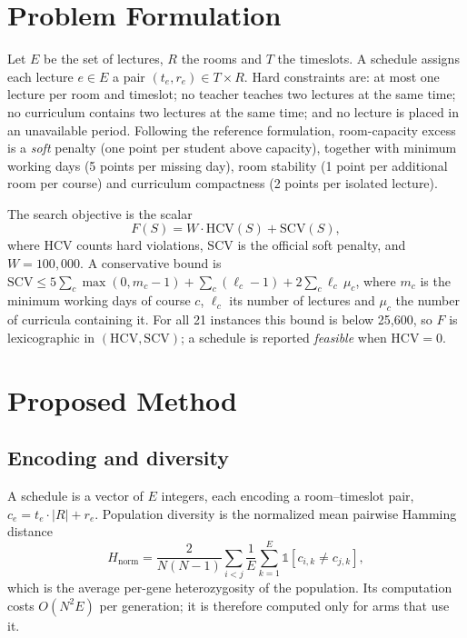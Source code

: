 \documentclass[journal]{IEEEtran}
\begin{document}
\section{Problem Formulation}
\label{sec:problem}
Let $E$ be the set of lectures, $R$ the rooms and $T$ the timeslots. A schedule assigns each lecture $e\in E$ a pair $(t_e,r_e)\in T\times R$. Hard constraints are: at most one lecture per room and timeslot; no teacher teaches two lectures at the same time; no curriculum contains two lectures at the same time; and no lecture is placed in an unavailable period. Following the reference formulation, room-capacity excess is a \emph{soft} penalty (one point per student above capacity), together with minimum working days (5 points per missing day), room stability (1 point per additional room per course) and curriculum compactness (2 points per isolated lecture).

The search objective is the scalar
\begin{equation}
F(S) = W\cdot \mathrm{HCV}(S) + \mathrm{SCV}(S),
\end{equation}
where $\mathrm{HCV}$ counts hard violations, $\mathrm{SCV}$ is the official soft penalty, and $W=100{,}000$. A conservative bound is $\mathrm{SCV}\le 5\sum_c\max(0,m_c-1)+\sum_c(\ell_c-1)+2\sum_c \ell_c\,\mu_c$, where $m_c$ is the minimum working days of course $c$, $\ell_c$ its number of lectures and $\mu_c$ the number of curricula containing it. For all 21 instances this bound is below 25{,}600, so $F$ is lexicographic in $(\mathrm{HCV},\mathrm{SCV})$; a schedule is reported \emph{feasible} when $\mathrm{HCV}=0$.

\section{Proposed Method}
\label{sec:method}
\subsection{Encoding and diversity}
A schedule is a vector of $E$ integers, each encoding a room--timeslot pair, $c_e = t_e\cdot|R| + r_e$. Population diversity is the normalized mean pairwise Hamming distance
\begin{equation}
H_{\mathrm{norm}} = \frac{2}{N(N-1)}\sum_{i<j}\frac{1}{E}\sum_{k=1}^{E}\mathbb{1}\!\left[c_{i,k}\neq c_{j,k}\right],
\end{equation}
which is the average per-gene heterozygosity of the population. Its computation costs $O(N^2E)$ per generation; it is therefore computed only for arms that use it.
\end{document}
